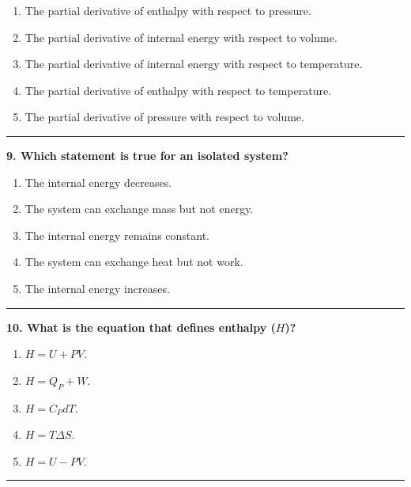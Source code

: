 \documentclass[
  9pt,
]{extbook}
\providecommand{\tightlist}{%
  \setlength{\itemsep}{0pt}\setlength{\parskip}{0pt}}
\theoremstyle{definition}
\theoremstyle{definition}
\theoremstyle{definition}
\theoremstyle{remark}
\begin{document}
\begin{enumerate}
\def\labelenumi{\alph{enumi}.}
\tightlist
\item
  The partial derivative of enthalpy with respect to pressure.
\item
  The partial derivative of internal energy with respect to volume.
\item
  The partial derivative of internal energy with respect to temperature.
\item
  The partial derivative of enthalpy with respect to temperature.
\item
  The partial derivative of pressure with respect to volume.
\end{enumerate}

\begin{center}\rule{0.5\linewidth}{0.5pt}\end{center}

\textbf{9. Which statement is true for an isolated system?}

\begin{enumerate}
\def\labelenumi{\alph{enumi}.}
\tightlist
\item
  The internal energy decreases.
\item
  The system can exchange mass but not energy.
\item
  The internal energy remains constant.
\item
  The system can exchange heat but not work.
\item
  The internal energy increases.
\end{enumerate}

\begin{center}\rule{0.5\linewidth}{0.5pt}\end{center}

\textbf{10. What is the equation that defines enthalpy (\(H\))?}

\begin{enumerate}
\def\labelenumi{\alph{enumi}.}
\tightlist
\item
  \(H = U + PV\).
\item
  \(H = Q_P + W\).
\item
  \(H = C_P dT\).
\item
  \(H = T \Delta S\).
\item
  \(H = U - PV\).
\end{enumerate}

\begin{center}\rule{0.5\linewidth}{0.5pt}\end{center}
\end{document}
